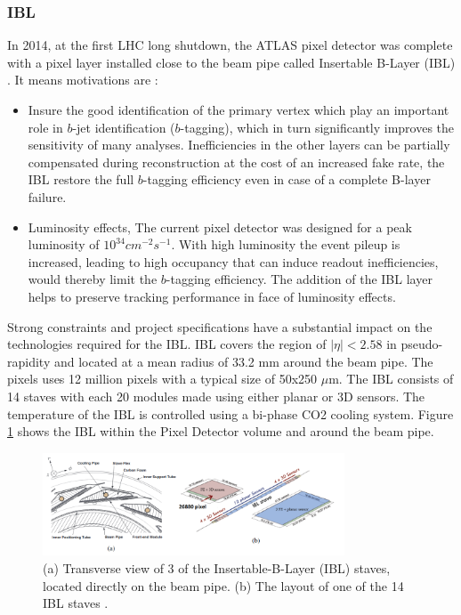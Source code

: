 \subsubsection{IBL}
\label{chap2:ATLAS:ITK:IBL}
In 2014, at the first LHC long shutdown, the ATLAS pixel detector was complete with a pixel layer installed close to the beam pipe called Insertable B-Layer (IBL) \cite{IBL_TDR}. It means motivations are :
\begin{itemize}
	\item Insure the good identification of the primary vertex which play an important role in $b$-jet identification ($b$-tagging), which in turn significantly improves the sensitivity of many analyses. Inefficiencies in the other layers can be partially compensated during reconstruction at the cost of an increased fake rate, the IBL restore the full $b$-tagging efficiency even in case of a complete B-layer failure.
	\item Luminosity effects, The current pixel detector was designed for a peak luminosity of $10^{34} cm^{-2}s^{-1}$. With high luminosity the event pileup is increased, leading to high occupancy that can induce readout inefficiencies, would thereby limit the $b$-tagging efficiency. The addition of the IBL layer helps to preserve tracking performance in face of luminosity effects.
\end{itemize}
Strong constraints and project specifications have a substantial impact on the technologies required for the IBL. IBL covers the region of $|\eta|< 2.58$ in pseudo-rapidity and located at a mean radius of 33.2 mm around the beam pipe. The pixels uses 12 million pixels with a typical size of 50x250 $\mu$m. The IBL consists of 14 staves with each 20 modules made using either planar or 3D sensors. The temperature of the IBL is controlled using a bi-phase CO2 cooling system. Figure \ref{fig:chap2:ATLAS:ITK:IBL} shows the IBL within the Pixel Detector volume and around the beam pipe.
\begin{figure}[H]
    \centering
    \includegraphics[width=0.8\textwidth]{Ch2/Img/IBL.png}
    \caption{(a) Transverse view of 3 of the Insertable-B-Layer (IBL) staves, located directly on the beam pipe. (b) The layout of one of the 14 IBL staves \cite{ID_withIBL}.}
    \label{fig:chap2:ATLAS:ITK:IBL}
\end{figure}

